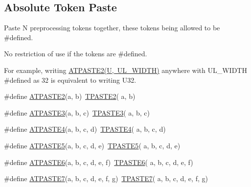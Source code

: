 \subsection*{Absolute Token Paste}
\label{_amgrp61c59096cd4b7958303a985954baa7ca}%
Paste N preprocessing tokens together, these tokens being allowed to be \#defined.

No restriction of use if the tokens are \#defined.

For example, writing \mbox{\hyperlink{group__group__sam0__utils__tpaste_gafd3b4e313492a0862292dc3072d8e347}{A\+T\+P\+A\+S\+T\+E2(\+U, U\+L\+\_\+\+W\+I\+D\+T\+H)}} anywhere with U\+L\+\_\+\+W\+I\+D\+TH \#defined as 32 is equivalent to writing U32. \begin{DoxyCompactItemize}
\item 
\#define \mbox{\hyperlink{group__group__sam0__utils__tpaste_gafd3b4e313492a0862292dc3072d8e347}{A\+T\+P\+A\+S\+T\+E2}}(a,  b)~\mbox{\hyperlink{group__group__sam0__utils__tpaste_ga55fb148844f5ba993a992b609728e82e}{T\+P\+A\+S\+T\+E2}}( a, b)
\item 
\#define \mbox{\hyperlink{group__group__sam0__utils__tpaste_ga80b7594516326045fbcaec54d7759c20}{A\+T\+P\+A\+S\+T\+E3}}(a,  b,  c)~\mbox{\hyperlink{group__group__sam0__utils__tpaste_ga3774e5e321825e6ab4a27fef2a0deb14}{T\+P\+A\+S\+T\+E3}}( a, b, c)
\item 
\#define \mbox{\hyperlink{group__group__sam0__utils__tpaste_gad9dcc51074148a4ff01810033a41e282}{A\+T\+P\+A\+S\+T\+E4}}(a,  b,  c,  d)~\mbox{\hyperlink{group__group__sam0__utils__tpaste_ga7df52ac8ee04480944ef404ef9418b38}{T\+P\+A\+S\+T\+E4}}( a, b, c, d)
\item 
\#define \mbox{\hyperlink{group__group__sam0__utils__tpaste_ga4e4994267872724c11e31f1274c1a84c}{A\+T\+P\+A\+S\+T\+E5}}(a,  b,  c,  d,  e)~\mbox{\hyperlink{group__group__sam0__utils__tpaste_gac9624b958617cbb3281de7ec41f53230}{T\+P\+A\+S\+T\+E5}}( a, b, c, d, e)
\item 
\#define \mbox{\hyperlink{group__group__sam0__utils__tpaste_ga5bbd1842581ea1fa81616d3222bda308}{A\+T\+P\+A\+S\+T\+E6}}(a,  b,  c,  d,  e,  f)~\mbox{\hyperlink{group__group__sam0__utils__tpaste_ga2c4dbcf9049d7553366bbf9b9bc4e801}{T\+P\+A\+S\+T\+E6}}( a, b, c, d, e, f)
\item 
\#define \mbox{\hyperlink{group__group__sam0__utils__tpaste_gabecc8ad964051f6f877f14dd13919b18}{A\+T\+P\+A\+S\+T\+E7}}(a,  b,  c,  d,  e,  f,  g)~\mbox{\hyperlink{group__group__sam0__utils__tpaste_gad36c0d6224338a4f8738aa25659afc14}{T\+P\+A\+S\+T\+E7}}( a, b, c, d, e, f, g)

\end{DoxyCompactItemize}
